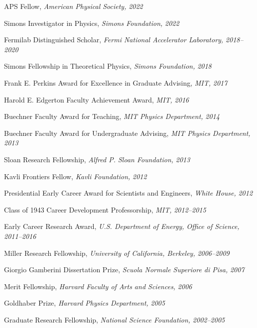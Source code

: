 \bbl
\item APS Fellow, \emph{American Physical Society, }\emph{2022}
\item Simons Investigator in Physics, \emph{Simons Foundation, }\emph{2022}
\item Fermilab Distinguished Scholar, \emph{Fermi National Accelerator Laboratory, }\emph{2018--2020}
\item Simons Fellowship in Theoretical Physics, \emph{Simons Foundation, }\emph{2018}
\item Frank E. Perkins Award for Excellence in Graduate Advising, \emph{MIT, }\emph{2017}
\item Harold E. Edgerton Faculty Achievement Award, \emph{MIT, }\emph{2016}
\item Buechner Faculty Award for Teaching, \emph{MIT Physics Department, }\emph{2014}
\item Buechner Faculty Award for Undergraduate Advising, \emph{MIT Physics Department, }\emph{2013}
\item Sloan Research Fellowship, \emph{Alfred P. Sloan Foundation, }\emph{2013}
\item Kavli Frontiers Fellow, \emph{Kavli Foundation, }\emph{2012}
\item Presidential Early Career Award for Scientists and Engineers, \emph{White House, }\emph{2012}
\item Class of 1943 Career Development Professorship, \emph{MIT, }\emph{2012--2015}
\item Early Career Research Award, \emph{U.S. Department of Energy, Office of Science, }\emph{2011--2016}
\item Miller Research Fellowship, \emph{University of California, Berkeley, }\emph{2006--2009}
\item Giorgio Gamberini Dissertation Prize, \emph{Scuola Normale Superiore di Pisa, }\emph{2007}
\item Merit Fellowship, \emph{Harvard Faculty of Arts and Sciences, }\emph{2006}
\item Goldhaber Prize, \emph{Harvard Physics Department, }\emph{2005}
\item Graduate Research Fellowship, \emph{National Science Foundation, }\emph{2002--2005}
\el
